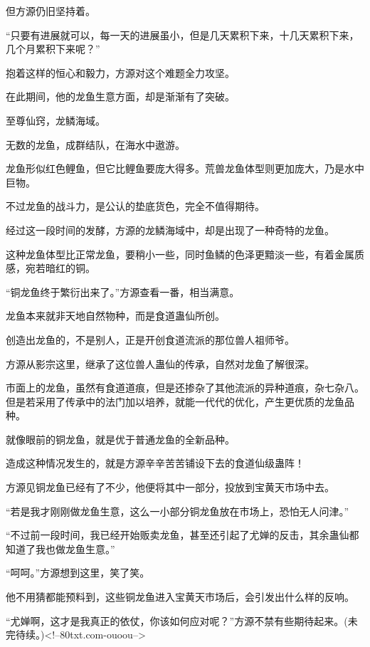 \begin{this_body}
但方源仍旧坚持着。

“只要有进展就可以，每一天的进展虽小，但是几天累积下来，十几天累积下来，几个月累积下来呢？”

抱着这样的恒心和毅力，方源对这个难题全力攻坚。

在此期间，他的龙鱼生意方面，却是渐渐有了突破。

至尊仙窍，龙鳞海域。

无数的龙鱼，成群结队，在海水中遨游。

龙鱼形似红色鲤鱼，但它比鲤鱼要庞大得多。荒兽龙鱼体型则更加庞大，乃是水中巨物。

不过龙鱼的战斗力，是公认的垫底货色，完全不值得期待。

经过这一段时间的发酵，方源的龙鳞海域中，却是出现了一种奇特的龙鱼。

这种龙鱼体型比正常龙鱼，要稍小一些，同时鱼鳞的色泽更黯淡一些，有着金属质感，宛若暗红的铜。

“铜龙鱼终于繁衍出来了。”方源查看一番，相当满意。

龙鱼本来就非天地自然物种，而是食道蛊仙所创。

创造出龙鱼的，不是别人，正是开创食道流派的那位兽人祖师爷。

方源从影宗这里，继承了这位兽人蛊仙的传承，自然对龙鱼了解很深。

市面上的龙鱼，虽然有食道道痕，但是还掺杂了其他流派的异种道痕，杂七杂八。但是若采用了传承中的法门加以培养，就能一代代的优化，产生更优质的龙鱼品种。

就像眼前的铜龙鱼，就是优于普通龙鱼的全新品种。

造成这种情况发生的，就是方源辛辛苦苦铺设下去的食道仙级蛊阵！

方源见铜龙鱼已经有了不少，他便将其中一部分，投放到宝黄天市场中去。

“若是我才刚刚做龙鱼生意，这么一小部分铜龙鱼放在市场上，恐怕无人问津。”

“不过前一段时间，我已经开始贩卖龙鱼，甚至还引起了尤婵的反击，其余蛊仙都知道了我也做龙鱼生意。”

“呵呵。”方源想到这里，笑了笑。

他不用猜都能预料到，这些铜龙鱼进入宝黄天市场后，会引发出什么样的反响。

“尤婵啊，这才是我真正的依仗，你该如何应对呢？”方源不禁有些期待起来。(未完待续。)<!--80txt.com-ouoou-->

\end{this_body}

